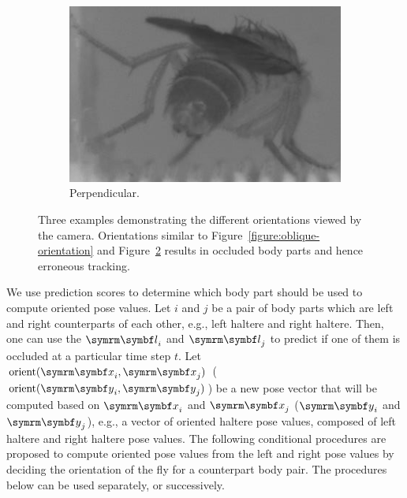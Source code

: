 \begin{figure}[ht!]
\begin{subfigure}[b]{0.3\linewidth}
		\centering\includegraphics[width=\linewidth]{figures/FlyOrientation-Perpendicular.png}
		\caption{Perpendicular.\label{figure:perpendicular-orientation}}
	\end{subfigure}
	\caption[Three examples demonstrating the different orientations viewed by the camera.]    {Three examples demonstrating the different orientations viewed by the camera. Orientations similar to Figure~\ref{figure:oblique-orientation} and Figure~\ref{figure:perpendicular-orientation} results in occluded body parts and hence erroneous tracking.}
\end{figure}

We use prediction scores to determine which body part should be used to compute oriented pose values.
Let $i$ and $j$ be a pair of body parts which are left and right counterparts of each other, e.g., left haltere and right haltere.
Then, one can use the $\V{l}_i$ and $\V{l}_j$ to predict if one of them is occluded at a particular time step $t$.
Let $\orient{\V{x}_i, \V{x}_j}$ ($\orient{\V{y}_i, \V{y}_j}$) be a new pose vector that will be computed based on $\V{x}_i$ and $\V{x}_j$ ($\V{y}_i$ and $\V{y}_j$), e.g., a vector of oriented haltere pose values, composed of left haltere and right haltere pose values.
The following conditional procedures are proposed to compute oriented pose values from the left and right pose values by deciding the orientation of the fly for a counterpart body pair. The procedures below can be used separately, or successively.

